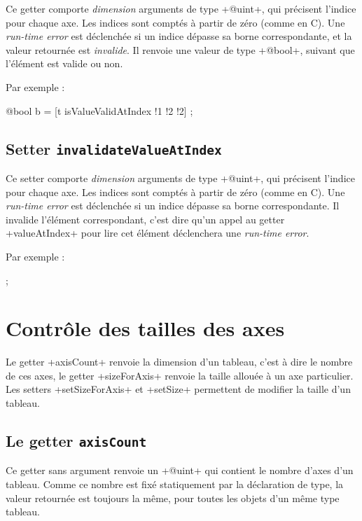 Ce getter comporte \emph{dimension} arguments de type \ggs+@uint+, qui précisent l'indice pour chaque axe. Les indices sont comptés à partir de zéro (comme en C). Une \emph{run-time error} est déclenchée si un indice dépasse sa borne correspondante, et la valeur retournée est \emph{invalide}. Il renvoie une valeur de type \ggs+@bool+, suivant que l'élément est valide ou non.

Par exemple :
\begin{galgascode}
  @bool b = [t isValueValidAtIndex !1 !2 !2] ;
\end{galgascode}


\subsection{Setter \texttt{invalidateValueAtIndex}}

Ce setter comporte \emph{dimension} arguments de type \ggs+@uint+, qui précisent l'indice pour chaque axe. Les indices sont comptés à partir de zéro (comme en C). Une \emph{run-time error} est déclenchée si un indice dépasse sa borne correspondante. Il invalide l'élément correspondant, c'est dire qu'un appel au getter \ggs+valueAtIndex+ pour lire cet élément déclenchera une \emph{run-time error}.

Par exemple :
\begin{galgascode}
  [!?t invalidateValueAtIndex !1 !2 !2] ;
\end{galgascode}





\section{Contrôle des tailles des axes}

Le getter \ggs+axisCount+ renvoie la dimension d'un tableau, c'est à dire le nombre de ces axes, le getter \ggs+sizeForAxis+ renvoie la taille allouée à un axe particulier. Les setters \ggs+setSizeForAxis+ et \ggs+setSize+ permettent de modifier la taille d'un tableau.



\subsection{Le getter \texttt{axisCount}}

Ce getter sans argument renvoie un \ggs+@uint+ qui contient le nombre d'axes d'un tableau. Comme ce nombre est fixé statiquement par la déclaration de type, la valeur retournée est toujours la même, pour toutes les objets d'un même type tableau.


